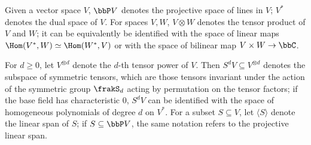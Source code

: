 
Given a vector space $V$, $\bbP V$ denotes the projective space of lines in $V$; $V^*$ denotes the dual space of $V$. For spaces $V ,W$, $V \otimes W$ denotes the tensor product of $V$ and $W$; it can be equivalently be identified with the space of linear maps $\Hom(V^*,W) \simeq \Hom(W^*,V)$ or with the space of bilinear map $V \times W \to \bbC$.

For $d \geq 0$, let $V^{\otimes d}$ denote the $d$-th tensor power of $V$. Then $S^d V \subseteq V^{\otimes d}$ denotes the subspace of symmetric tensors, which are those tensors invariant under the action of the symmetric group $\frakS_d$ acting by permutation on the tensor factors; if the base field has characteristic $0$, $S^d V$ can be identified with the space of homogeneous polynomials of degree $d$ on $V^*$. For a subset $S \subseteq V$, let $\langle S \rangle$ denote the linear span of $S$; if $S \subseteq \bbP V$, the same notation refers to the projective linear span.
